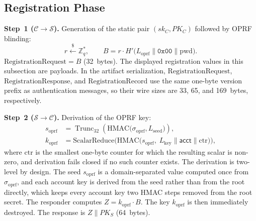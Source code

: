 \documentclass{ieeeijc}
\newcommand{\acct}{\mathsf{acct}}
\newcommand{\sigoprf}{\sigma_{\mathrm{oprf}}}
\newcommand{\Label}[1]{L_{\mathrm{#1}}}
\theoremstyle{remark}
\begin{document}
\subsection{Registration Phase}

\textbf{Step~1 ($\mathcal{C} \to \mathcal{S}$).} Generation of the
static pair $(sk_C, PK_C)$ followed by OPRF blinding:
\begin{equation}
  r \xleftarrow{\$} \mathbb{Z}_q^*, \qquad
  B = r \cdot H'\!\bigl(\Label{oprf} \| \mathtt{0x00} \| \mathrm{pwd}\bigr).
  \label{eq:reg-blind}
\end{equation}
$\mathrm{RegistrationRequest} = B$ (32~bytes).
The displayed registration values in this subsection are payloads. In the
artifact serialization, $\mathrm{RegistrationRequest}$,
$\mathrm{RegistrationResponse}$, and $\mathrm{RegistrationRecord}$ use the
same one-byte version prefix as authentication messages, so their wire
sizes are 33, 65, and 169~bytes, respectively.

\textbf{Step~2 ($\mathcal{S} \to \mathcal{C}$).} Derivation of the OPRF
key:
\begin{align}
  s_{\mathrm{oprf}}
    &= \operatorname{Trunc}_{32}\!\left(
      \mathrm{HMAC}\!\bigl(\sigoprf, \Label{seed}\bigr)\right),
    \\
  k_{\mathrm{oprf}}
    &= \mathrm{ScalarReduce}\!\bigl(
      \mathrm{HMAC}\!\bigl(
        s_{\mathrm{oprf}},\;
        \Label{key} \| \acct \| \mathrm{ctr}
      \bigr)\bigr),
    \label{eq:oprf-key}
\end{align}
where $\mathrm{ctr}$ is the smallest one-byte counter for which the resulting
scalar is non-zero, and derivation fails closed if no such counter exists.
The derivation is two-level by design. The seed
$s_{\mathrm{oprf}}$ is a domain-separated value computed once from $\sigoprf$,
and each account key is derived from the seed rather than from the root
directly, which keeps every account key two HMAC steps removed from the root
secret. The responder computes
$Z = k_{\mathrm{oprf}} \cdot B$. The key $k_{\mathrm{oprf}}$ is then
immediately destroyed. The response is
$Z \| PK_S$ (64~bytes).
\end{document}
